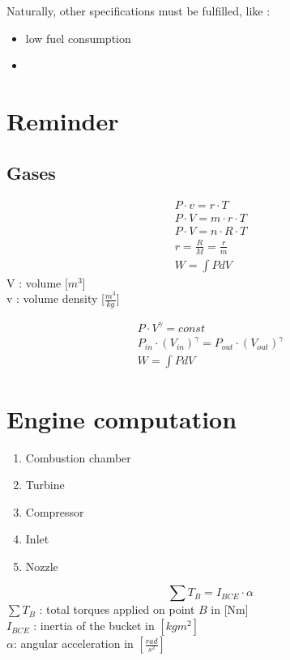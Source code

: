 \documentclass[12pt,a4paper]{article}
\begin{document}
	Naturally, other specifications must be fulfilled, like :
	\begin{itemize}
		\item low fuel consumption
		\item 
	\end{itemize}
	
	\newpage
	
	\section{Reminder}
	\subsection{Gases}
	\begin{eqnarray}
		P \cdot v= r \cdot T\\
		P \cdot V= m \cdot r \cdot T\\
		P \cdot V= n \cdot R \cdot T\\
		r = \frac{R}{M} = \frac{r}{m}\\
		W =\int P dV
	\end{eqnarray}
	V : volume [$m^3$] \\
	v : volume density [$\frac{m^3}{kg}$]
	
	\begin{eqnarray}
		P \cdot V^{\gamma} = const\\
		P_{in} \cdot (V_{in})^{\gamma} = P_{out} \cdot (V_{out})^{\gamma}\\
		W =\int P dV
	\end{eqnarray}
	
	\section{Engine computation}
	\begin{enumerate}
		\item Combustion chamber
		\item Turbine
		\item Compressor
		\item Inlet
		\item Nozzle
	\end{enumerate}

	
		 
	\newpage
	\begin{equation}
		\sum T_B = I_{BCE} \cdot \alpha
	\end{equation}
	$\sum T_B$ : total torques applied on point $B$ in [Nm]\\
	$I_{BCE}$ : inertia of the bucket in $[kg m^2]$\\
	$\alpha$: angular acceleration in $[\frac{rad}{s^2}] $
	
\end{document}
